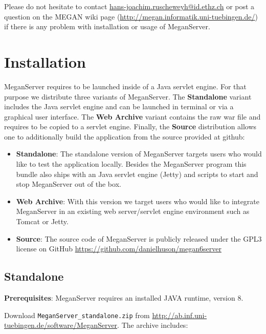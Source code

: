 \documentclass[11pt]{article}
\begin{document}
Please do not hesitate to contact \href{mailto:hans-joachim.ruscheweyh@id.ethz.ch}{hans-joachim.ruscheweyh@id.ethz.ch} or post a question on the MEGAN wiki page (\url{http://megan.informatik.uni-tuebingen.de/}) if there is any problem with installation or usage of MeganServer.

\section{Installation}

MeganServer requires to be launched inside of a Java servlet engine. For that purpose we distribute three variants of MeganServer. The \textbf{Standalone} variant includes the Java servlet engine and can be launched in terminal or via a graphical user interface. The \textbf{Web Archive} variant contains the raw war file and requires to be copied to a servlet engine. Finally, the \textbf{Source} distribution allows one to additionally build the application from the source provided at github:

\begin{itemize}
\item \textbf{Standalone}: The standalone version of MeganServer targets users who would like to test the application locally. Besides the MeganServer program this bundle also ships with an Java servlet engine (Jetty) and scripts to start and stop MeganServer out of the box.
\item \textbf{Web Archive}: With this version we target users who would like to integrate MeganServer in an existing web server/servlet engine environment such as Tomcat or Jetty.
\item \textbf{Source}: The source code of MeganServer is publicly released under the GPL3 license on GitHub \url{https://github.com/danielhuson/megan6server}
\end{itemize} 

\subsection{Standalone}
\textbf{Prerequisites}: MeganServer requires an installed JAVA runtime, version 8.

Download \texttt{MeganServer\_standalone.zip} from \url{http://ab.inf.uni-tuebingen.de/software/MeganServer}. The archive includes:
\end{document}
